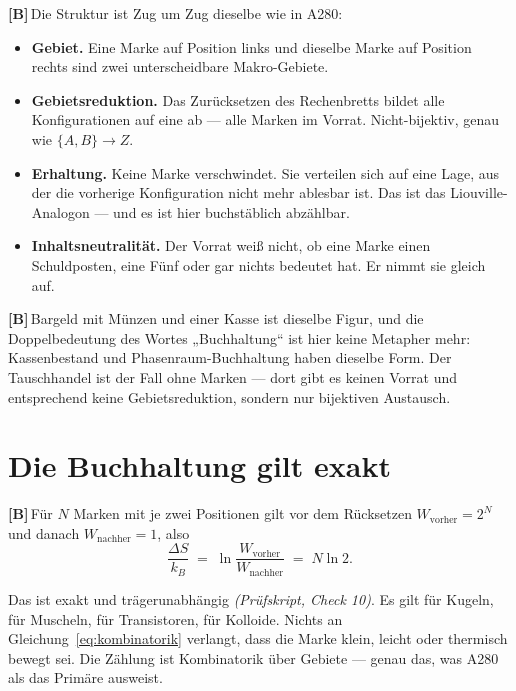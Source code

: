 \documentclass[11pt,a4paper]{article}
\newcommand{\LB}{\textcolor{layB}{\textbf{\footnotesize\textsf{[B]}}}\,}
\newcommand{\pruef}[1]{{\small\itshape(Prüfskript, #1)}}
\begin{document}
\LB Die Struktur ist Zug um Zug dieselbe wie in A280:

\begin{itemize}[leftmargin=1.4em,itemsep=0.3em]
  \item \textbf{Gebiet.} Eine Marke auf Position links und dieselbe Marke auf
        Position rechts sind zwei unterscheidbare Makro-Gebiete.
  \item \textbf{Gebietsreduktion.} Das Zurücksetzen des Rechenbretts bildet alle
        Konfigurationen auf eine ab --- alle Marken im Vorrat. Nicht-bijektiv,
        genau wie $\{A,B\}\to Z$.
  \item \textbf{Erhaltung.} Keine Marke verschwindet. Sie verteilen sich auf eine
        Lage, aus der die vorherige Konfiguration nicht mehr ablesbar ist. Das ist
        das Liouville-Analogon --- und es ist hier buchstäblich abzählbar.
  \item \textbf{Inhaltsneutralität.} Der Vorrat weiß nicht, ob eine Marke einen
        Schuldposten, eine Fünf oder gar nichts bedeutet hat. Er nimmt sie gleich
        auf.
\end{itemize}

\LB Bargeld mit Münzen und einer Kasse ist dieselbe Figur, und die Doppelbedeutung
des Wortes „Buchhaltung“ ist hier keine Metapher mehr: Kassenbestand und
Phasenraum-Buchhaltung haben dieselbe Form. Der Tauschhandel ist der Fall ohne
Marken --- dort gibt es keinen Vorrat und entsprechend keine Gebietsreduktion,
sondern nur bijektiven Austausch.

\section{Die Buchhaltung gilt exakt}

\LB Für $N$ Marken mit je zwei Positionen gilt vor dem Rücksetzen
$W_{\text{vorher}} = 2^N$ und danach $W_{\text{nachher}} = 1$, also
\begin{equation}
  \frac{\Delta S}{k_B} \;=\; \ln\frac{W_{\text{vorher}}}{W_{\text{nachher}}}
  \;=\; N \ln 2 .
  \label{eq:kombinatorik}
\end{equation}

Das ist exakt und trägerunabhängig \pruef{Check 10}. Es gilt für Kugeln, für
Muscheln, für Transistoren, für Kolloide. Nichts an
Gleichung~\eqref{eq:kombinatorik} verlangt, dass die Marke klein, leicht oder
thermisch bewegt sei. Die Zählung ist Kombinatorik über Gebiete --- genau das,
was A280 als das Primäre ausweist.
\end{document}
